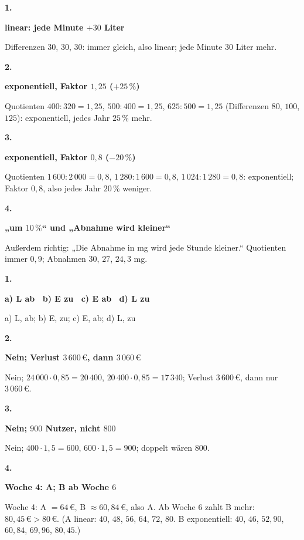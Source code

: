 \documentclass[11pt]{article}
\newcommand{\lsg}[3]{\par\noindent\begin{minipage}[t]{9mm}\textbf{#1}\end{minipage}%
  \begin{minipage}[t]{52mm}\raggedright\bfseries\boldmath #2\end{minipage}\hspace{3mm}%
  \begin{minipage}[t]{\dimexpr\linewidth-64mm\relax}\raggedright\small #3\end{minipage}\par\vspace{4pt}}
\begin{document}
\par\smallskip
{}\par
\par\Needspace{25mm}\vspace{6pt}\noindent\colorbox{black!12}{}\hspace{2mm}{\bfseries An der Tabelle erkennen}\par\vspace{4pt}
\lsg{1.}{linear: jede Minute $+30$ Liter}{Differenzen $30$, $30$, $30$: immer gleich, also linear; jede Minute $30$ Liter mehr.}
\lsg{2.}{exponentiell, Faktor $1{,}25$ ($+25\,\%$)}{Quotienten $400 : 320 = 1{,}25$, $500 : 400 = 1{,}25$, $625 : 500 = 1{,}25$ (Differenzen $80$, $100$, $125$): exponentiell, jedes Jahr $25\,\%$ mehr.}
\lsg{3.}{exponentiell, Faktor $0{,}8$ ($-20\,\%$)}{Quotienten $1\,600 : 2\,000 = 0{,}8$, $1\,280 : 1\,600 = 0{,}8$, $1\,024 : 1\,280 = 0{,}8$: exponentiell; Faktor $0{,}8$, also jedes Jahr $20\,\%$ weniger.}
\lsg{4.}{„um $10\,\%$“ und „Abnahme wird kleiner“}{Außerdem richtig: „Die Abnahme in mg wird jede Stunde kleiner.“ Quotienten immer $0{,}9$; Abnahmen $30$, $27$, $24{,}3$ mg.}
\par\Needspace{25mm}\vspace{6pt}\noindent\colorbox{black!12}{}\hspace{2mm}{\bfseries Am Text erkennen}\par\vspace{4pt}
\lsg{1.}{a) L ab \ b) E zu \ c) E ab \ d) L zu}{a) L, ab; b) E, zu; c) E, ab; d) L, zu}
\lsg{2.}{Nein; Verlust $3\,600\,€$, dann $3\,060\,€$}{Nein; $24\,000 \cdot 0{,}85 = 20\,400$, $20\,400 \cdot 0{,}85 = 17\,340$; Verlust $3\,600\,€$, dann nur $3\,060\,€$.}
\lsg{3.}{Nein; $900$ Nutzer, nicht $800$}{Nein; $400 \cdot 1{,}5 = 600$, $600 \cdot 1{,}5 = 900$; doppelt wären $800$.}
\lsg{4.}{Woche 4: A; B ab Woche $6$}{Woche 4: A $= 64\,€$, B $\approx 60{,}84\,€$, also A. Ab Woche 6 zahlt B mehr: $80{,}45\,€ > 80\,€$. (A linear: $40$, $48$, $56$, $64$, $72$, $80$. B exponentiell: $40$, $46$, $52{,}90$, $60{,}84$, $69{,}96$, $80{,}45$.)}
\par\Needspace{25mm}\vspace{6pt}\noindent\colorbox{black!12}{}\hspace{2mm}{\bfseries Den passenden Graphen finden}\par\vspace{4pt}
\end{document}
